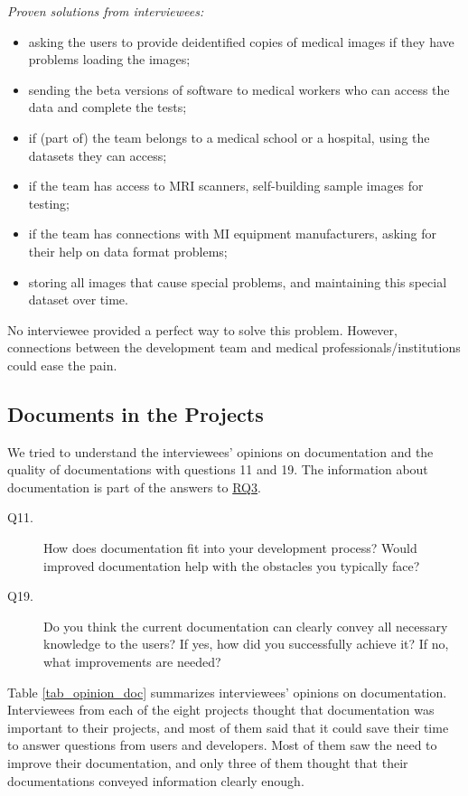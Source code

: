 \documentclass[3p, 12pt,authoryear]{elsarticle}
\begin{document}
\noindent\textit{Proven solutions from interviewees:}

\begin{itemize}
\item asking the users to provide deidentified copies of medical images if they
have problems loading the images;
\item sending the beta versions of software to medical workers who can access
the data and complete the tests;
\item if (part of) the team belongs to a medical school or a hospital, using the
datasets they can access;
\item if the team has access to MRI scanners, self-building sample images for
testing;
\item if the team has connections with MI equipment manufacturers, asking for
their help on data format problems;
\item storing all images that cause special problems, and maintaining this
special dataset over time.
\end{itemize}

No interviewee provided a perfect way to solve this problem. However,
connections between the development team and medical professionals/institutions
could ease the pain.

\subsection{Documents in the Projects} \label{sec_interview_documents}

We tried to understand the interviewees' opinions on documentation and the
quality of documentations with questions 11 and 19. The information about
documentation is part of the answers to \hyperlink{rq3}{RQ3}.

\begin{description}
\item[Q11.] How does documentation fit into your development process? Would
improved documentation help with the obstacles you typically face?
\item[Q19.] Do you think the current documentation can clearly convey all
necessary knowledge to the users? If yes, how did you successfully achieve it?
If no, what improvements are needed?
\end{description}

Table \ref{tab_opinion_doc} summarizes interviewees' opinions on documentation.
Interviewees from each of the eight projects thought that documentation was
important to their projects, and most of them said that it could save their time
to answer questions from users and developers. Most of them saw the need to
improve their documentation, and only three of them thought that their
documentations conveyed information clearly enough. 
\end{document}

